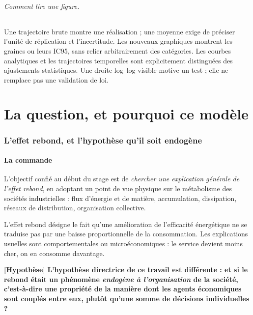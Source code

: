 \documentclass[11pt,a4paper]{article}
\newcommand{\hyp}{\textbf{[Hypothèse]}}
\begin{document}
\paragraph{Comment lire une figure.}
Une trajectoire brute montre une réalisation ; une moyenne exige de préciser
l'unité de réplication et l'incertitude. Les nouveaux graphiques montrent les
graines ou leurs IC95, sans relier arbitrairement des catégories. Les courbes
analytiques et les trajectoires temporelles sont explicitement distinguées
des ajustements statistiques. Une droite log--log visible motive un test ;
elle ne remplace pas une validation de loi.

\clearpage

\part{La question, et pourquoi ce modèle}

\section{L'effet rebond, et l'hypothèse qu'il soit endogène}

\subsection{La commande}

L'objectif confié au début du stage est de \emph{chercher une explication
générale de l'effet rebond}, en adoptant un point de vue physique sur le
métabolisme des sociétés industrielles : flux d'énergie et de matière,
accumulation, dissipation, réseaux de distribution, organisation collective.

L'effet rebond désigne le fait qu'une amélioration de l'efficacité
énergétique ne se traduise pas par une baisse proportionnelle de la
consommation. Les explications usuelles sont comportementales ou
microéconomiques : le service devient moins cher, on en consomme davantage.

\hyp{} \textbf{L'hypothèse directrice de ce travail est différente : et si le
rebond était un phénomène \emph{endogène à l'organisation} de la société,
c'est-à-dire une propriété de la manière dont les agents économiques sont
couplés entre eux, plutôt qu'une somme de décisions individuelles ?}
\end{document}
